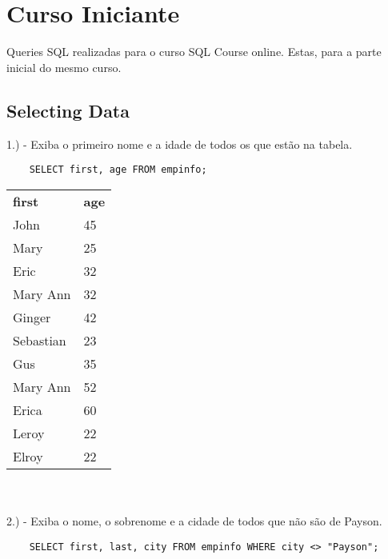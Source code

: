 \section{Curso Iniciante}
Queries SQL realizadas para o curso SQL Course online. Estas, para a parte inicial do mesmo curso.

\subsection{Selecting Data}

1.) - Exiba o primeiro nome e a idade de todos os que estão na tabela.

\begin{lstlisting}
    SELECT first, age FROM empinfo;
\end{lstlisting}

\begin{tabular}{l l}
    {\textbf{first}} & {\textbf{age}} \\
    {John}           & {45}           \\
    {Mary}           & {25}           \\
    {Eric}           & {32}           \\
    {Mary Ann}       & {32}           \\
    {Ginger}         & {42}           \\
    {Sebastian}      & {23}           \\
    {Gus}            & {35}           \\
    {Mary Ann}       & {52}           \\
    {Erica}          & {60}           \\
    {Leroy}          & {22}           \\
    {Elroy}          & {22}          
\end{tabular}\\ \\

2.) - Exiba o nome, o sobrenome e a cidade de todos que não são de Payson.

\begin{lstlisting}
    SELECT first, last, city FROM empinfo WHERE city <> "Payson";
\end{lstlisting}

